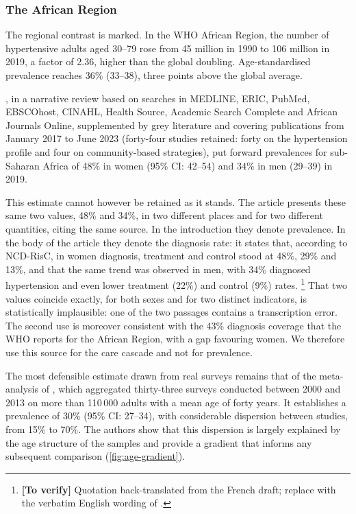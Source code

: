 \documentclass[12pt,a4paper,oneside]{report}
\newcommand{\verify}[1]{\footnote{\textbf{[To verify]} #1}}
\begin{document}
\subsubsection{The African Region}

The regional contrast is marked. In the WHO African Region, the number of hypertensive adults aged 30--79 rose from 45 million in 1990 to 106 million in 2019, a factor of 2.36, higher than the global doubling. Age-standardised prevalence reaches 36\% (33--38), three points above the global average.

\textcite{gafane2025}, in a narrative review based on searches in MEDLINE, ERIC, PubMed, EBSCOhost, CINAHL, Health Source, Academic Search Complete and African Journals Online, supplemented by grey literature and covering publications from January 2017 to June 2023 (forty-four studies retained: forty on the hypertension profile and four on community-based strategies), put forward prevalences for sub-Saharan Africa of 48\% in women (95\% CI: 42--54) and 34\% in men (29--39) in 2019.

This estimate cannot however be retained as it stands. The article presents these same two values, 48\% and 34\%, in two different places and for two different quantities, citing the same source. In the introduction they denote prevalence. In the body of the article they denote the diagnosis rate: it states that, according to NCD-RisC, in women diagnosis, treatment and control stood at 48\%, 29\% and 13\%, and that the same trend was observed in men, with 34\% diagnosed hypertension and even lower treatment (22\%) and control (9\%) rates.%
\verify{Quotation back-translated from the French draft; replace with the verbatim English wording of \textcite{gafane2025}.}
That two values coincide exactly, for both sexes and for two distinct indicators, is statistically implausible: one of the two passages contains a transcription error. The second use is moreover consistent with the 43\% diagnosis coverage that the WHO reports for the African Region, with a gap favouring women. We therefore use this source for the care cascade and not for prevalence.

The most defensible estimate drawn from real surveys remains that of the meta-analysis of \textcite{ataklte2015}, which aggregated thirty-three surveys conducted between 2000 and 2013 on more than 110\,000 adults with a mean age of forty years. It establishes a prevalence of 30\% (95\% CI: 27--34), with considerable dispersion between studies, from 15\% to 70\%. The authors show that this dispersion is largely explained by the age structure of the samples and provide a gradient that informs any subsequent comparison (\cref{fig:age-gradient}).
\end{document}
